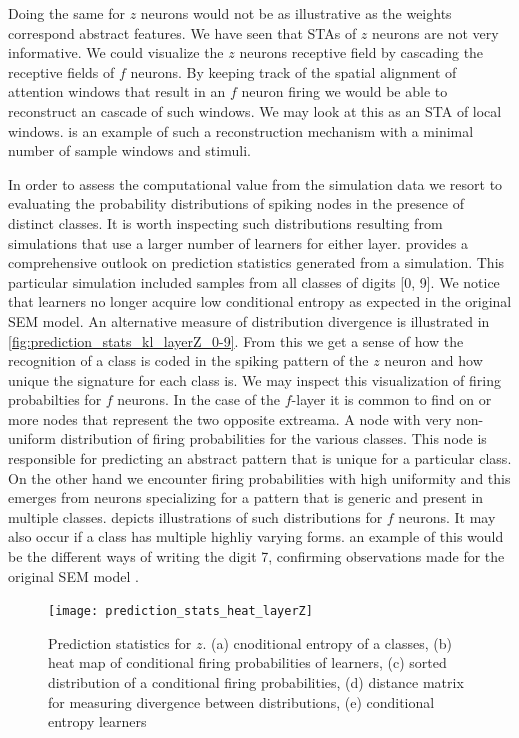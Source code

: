 \documentclass{report}
\begin{document}
Doing the same for $z$ neurons would not be as illustrative as the weights correspond abstract features. We have seen that STAs of $z$ neurons are not very informative. We could visualize the $z$ neurons receptive field by cascading the receptive fields of $f$ neurons. By keeping track of the spatial alignment of attention windows that result in an $f$ neuron firing we would be able to reconstruct an cascade of such windows. We may look at this as an STA of local windows.  is an example of such a reconstruction mechanism with a minimal number of sample windows and stimuli. 

In order to assess the computational value from the simulation data we resort to evaluating the probability distributions of spiking nodes in the presence of distinct classes. It is worth inspecting such distributions resulting from simulations that use a larger number of learners for either layer.  provides a comprehensive outlook on prediction statistics generated from a simulation. This particular simulation included samples from all classes of digits [0, 9]. We notice that learners no longer acquire low conditional entropy as expected in the original SEM model. An alternative measure of distribution divergence is illustrated in \cref{fig:prediction_stats_kl_layerZ_0-9}. From this we get a sense of how the recognition of a class is coded in the spiking pattern of the $z$ neuron and how unique the signature for each class is. We may inspect this visualization of firing probabilties for $f$ neurons. In the case of the $f$-layer it is common to find on or more nodes that represent the two opposite extreama. A node with very non-uniform distribution of firing probabilities for the various classes. This node is responsible for predicting an abstract pattern that is unique for a particular class. On the other hand we encounter firing probabilities with high uniformity and this emerges from neurons specializing for a pattern that is generic and present in multiple classes.  depicts illustrations of such distributions for $f$ neurons. It may also occur if a class has multiple highliy varying forms. an example of this would be the different ways of writing the digit 7, confirming observations made for the original SEM model \cite{Nessler2010}.\\

\begin{figure}[ht]
\centering
\texttt{[image: prediction\_stats\_heat\_layerZ]}
\caption{Prediction statistics for $z$. (a) cnoditional entropy of a classes, (b) heat map of conditional firing probabilities of learners, (c) sorted distribution of a conditional firing probabilities, (d) distance matrix for measuring divergence between distributions, (e) conditional entropy learners 
\label{fig:prediction_stats_heat_layerZ}}
\end{figure}
\end{document}
